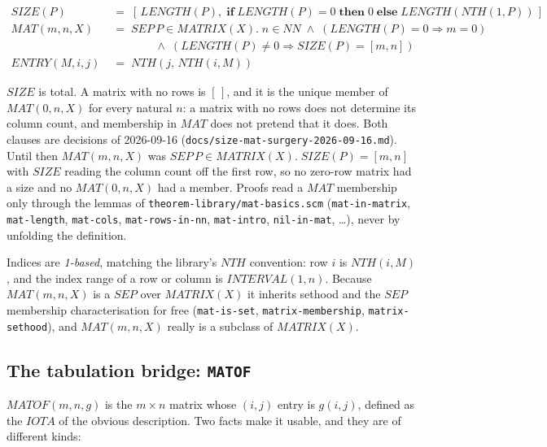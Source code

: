 \begin{align*}
\mathit{SIZE}(P) &\;=\; [\,\mathit{LENGTH}(P),\;
   \mathbf{if}\; \mathit{LENGTH}(P) = 0 \;\mathbf{then}\; 0
   \;\mathbf{else}\; \mathit{LENGTH}(\mathit{NTH}(1, P))\,] \\
\mathit{MAT}(m, n, X) &\;=\; \mathit{SEP}\, P \in \mathit{MATRIX}(X).\;
   n \in \mathit{NN} \;\wedge\;
   (\mathit{LENGTH}(P) = 0 \Rightarrow m = 0) \\
 &\qquad\qquad \wedge\;
   (\mathit{LENGTH}(P) \neq 0 \Rightarrow \mathit{SIZE}(P) = [m, n]) \\
\mathit{ENTRY}(M, i, j) &\;=\; \mathit{NTH}(j,\, \mathit{NTH}(i, M))
\end{align*}

\noindent
$\mathit{SIZE}$ is total.  A matrix with no rows is $[\,]$, and it is
the unique member of $\mathit{MAT}(0, n, X)$ for every natural $n$: a
matrix with no rows does not determine its column count, and membership
in $\mathit{MAT}$ does not pretend that it does.  Both clauses are
decisions of 2026-09-16 (\texttt{docs/size-mat-surgery-2026-09-16.md}).
Until then $\mathit{MAT}(m,n,X)$ was $\mathit{SEP}\, P \in
\mathit{MATRIX}(X).\; \mathit{SIZE}(P) = [m,n]$ with $\mathit{SIZE}$
reading the column count off the first row, so no zero-row matrix had a
size and no $\mathit{MAT}(0,n,X)$ had a member.  Proofs read a
$\mathit{MAT}$ membership only through the lemmas of
\texttt{theorem-library/mat-basics.scm} (\texttt{mat-in-matrix},
\texttt{mat-length}, \texttt{mat-cols}, \texttt{mat-rows-in-nn},
\texttt{mat-intro}, \texttt{nil-in-mat}, \ldots), never by unfolding the
definition.

Indices are \emph{1-based}, matching the library's $\mathit{NTH}$
convention: row $i$ is $\mathit{NTH}(i, M)$, and the index range of a
row or column is $\mathit{INTERVAL}(1, n)$.  Because
$\mathit{MAT}(m,n,X)$ is a $\mathit{SEP}$ over $\mathit{MATRIX}(X)$ it
inherits sethood and the $\mathit{SEP}$ membership characterisation for
free (\texttt{mat-is-set}, \texttt{matrix-membership},
\texttt{matrix-sethood}), and $\mathit{MAT}(m,n,X)$ really is a subclass
of $\mathit{MATRIX}(X)$.

\subsection{The tabulation bridge: \texttt{MATOF}}

$\mathit{MATOF}(m, n, g)$ is the $m \times n$ matrix whose $(i,j)$ entry
is $g(i,j)$, defined as the $\mathit{IOTA}$ of the obvious description.
Two facts make it usable, and they are of different kinds:

